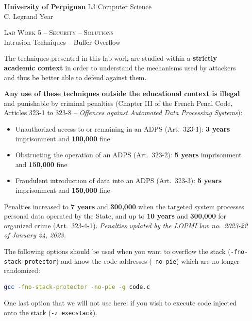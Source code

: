 \documentclass[a4paper,11pt]{article}
\theoremstyle{plain}
\theoremstyle{definition}
\begin{document}
\hbox{}
\noindent \textbf{University of Perpignan} \hfill  L3 Computer Science \\
 \hfill C. Legrand \hfill  Year \the\year \\
\smallskip
\begin{center}
{
  {\scshape \large Lab Work 5 -- Security -- Solutions}  \\
 Intrusion Techniques -- Buffer Overflow
}
\end{center}
\hbox{}

\bigskip

\begin{ethique}
The techniques presented in this lab work are studied within a \textbf{strictly academic context} in order to understand the mechanisms used by attackers and thus be better able to defend against them.

\textbf{Any use of these techniques outside the educational context is illegal} and punishable by criminal penalties (Chapter III of the French Penal Code, Articles 323-1 to 323-8 -- \textit{Offences against Automated Data Processing Systems}):
\begin{itemize}
    \item Unauthorized access to or remaining in an ADPS (Art.~323-1): \textbf{3 years} imprisonment and \textbf{\texteuro{}100,000} fine
    \item Obstructing the operation of an ADPS (Art.~323-2): \textbf{5 years} imprisonment and \textbf{\texteuro{}150,000} fine
    \item Fraudulent introduction of data into an ADPS (Art.~323-3): \textbf{5 years} imprisonment and \textbf{\texteuro{}150,000} fine
\end{itemize}
Penalties increased to \textbf{7 years} and \textbf{\texteuro{}300,000} when the targeted system processes personal data operated by the State, and up to \textbf{10 years} and \textbf{\texteuro{}300,000} for organized crime (Art.~323-4-1). \textit{Penalties updated by the LOPMI law no.~2023-22 of January 24, 2023.}
\end{ethique}

\bigskip

\begin{tcolorbox}[colback=gray!5!white, colframe=gray!60!black, title={Compilation Options}]
The following options should be used when you want to overflow the stack (\texttt{-fno-stack-protector}) and know the code addresses (\texttt{-no-pie}) which are no longer randomized:
\begin{lstlisting}[language=bash,numbers=none]
gcc -fno-stack-protector -no-pie -g code.c
\end{lstlisting}
One last option that we will not use here: if you wish to execute code injected onto the stack (\texttt{-z execstack}).
\end{tcolorbox}
\end{document}
